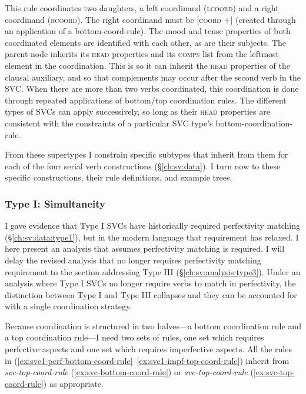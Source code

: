 This rule coordinates two daughters, a left coordinand (\textsc{lcoord}) and a right coordinand (\textsc{rcoord}). The right coordinand must be [\textsc{coord} +] (created through an application of a bottom-coord-rule). The mood and tense properties of both coordinated elements are identified with each other, as are their subjects. The parent node inherits its \textsc{head} properties and its \textsc{comps} list from the leftmost element in the coordination. This is so it can inherit the \textsc{head} properties of the clausal auxiliary, and so that complements may occur after the second verb in the SVC. When there are more than two verbs coordinated, this coordination is done through repeated applications of bottom/top coordination rules. The different types of SVCs can apply successively, so long as their \textsc{head} properties are consistent with the constraints of a particular SVC type's bottom-coordination-rule.

From these supertypes I constrain specific subtypes that inherit from them for each of the four serial verb constructions (\S\ref{ch:sv:data}). I turn now to these specific constructions, their rule definitions, and example trees.

\subsubsection{Type I: Simultaneity} \label{ch:sv:analysis:type1}

I gave evidence that Type I SVCs have historically required perfectivity matching (\S\ref{ch:sv:data:type1}), but in the modern language that requirement has relaxed. I here present an analysis that assumes perfectivity matching is required. I will delay the revised analysis that no longer requires perfectivity matching requirement to the section addressing Type III (\S\ref{ch:sv:analysis:type3}). Under an analysis where Type I SVCs no longer require verbs to match in perfectivity, the distinction between Type I and Type III collapses and they can be accounted for with a single coordination strategy.

Because coordination is structured in two halves---a bottom coordination rule and a top coordination rule---I need two sets of rules, one set which requires perfective aspects and one set which requires imperfective aspects. All the rules in (\ref{ex:svc1-perf-bottom-coord-rule}--\ref{ex:svc1-impf-top-coord-rule}) inherit from {\textit{svc-top-coord-rule}} (\ref{ex:svc-bottom-coord-rule}) or {\textit{svc-top-coord-rule}} (\ref{ex:svc-top-coord-rule}) as appropriate.

